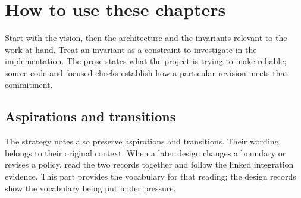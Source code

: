 \section*{How to use these chapters}

Start with the vision, then the architecture and the invariants relevant to the work at hand. Treat an invariant as a constraint to investigate in the implementation. The prose states what the project is trying to make reliable; source code and focused checks establish how a particular revision meets that commitment.

\subsection*{Aspirations and transitions}

The strategy notes also preserve aspirations and transitions. Their wording belongs to their original context. When a later design changes a boundary or revises a policy, read the two records together and follow the linked integration evidence. This part provides the vocabulary for that reading; the design records show the vocabulary being put under pressure.
